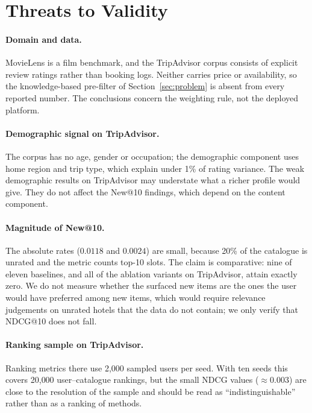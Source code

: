 \documentclass[runningheads]{llncs}
\begin{document}
\section{Threats to Validity}
\label{sec:threats}

\paragraph{Domain and data.} MovieLens is a film benchmark, and the TripAdvisor corpus consists of explicit review ratings rather than booking logs. Neither carries price or availability, so the knowledge-based pre-filter of Section~\ref{sec:problem} is absent from every reported number. The conclusions concern the weighting rule, not the deployed platform.

\paragraph{Demographic signal on TripAdvisor.} The corpus has no age, gender or occupation; the demographic component uses home region and trip type, which explain under 1\% of rating variance. The weak demographic results on TripAdvisor may understate what a richer profile would give. They do not affect the New@10 findings, which depend on the content component.

\paragraph{Magnitude of New@10.} The absolute rates ($0.0118$ and $0.0024$) are small, because 20\% of the catalogue is unrated and the metric counts top-10 slots. The claim is comparative: nine of eleven baselines, and all of the ablation variants on TripAdvisor, attain exactly zero. We do not measure whether the surfaced new items are the ones the user would have preferred among new items, which would require relevance judgements on unrated hotels that the data do not contain; we only verify that NDCG@10 does not fall.

\paragraph{Ranking sample on TripAdvisor.} Ranking metrics there use 2{,}000 sampled users per seed. With ten seeds this covers 20{,}000 user--catalogue rankings, but the small NDCG values ($\approx 0.003$) are close to the resolution of the sample and should be read as ``indistinguishable'' rather than as a ranking of methods.
\end{document}
